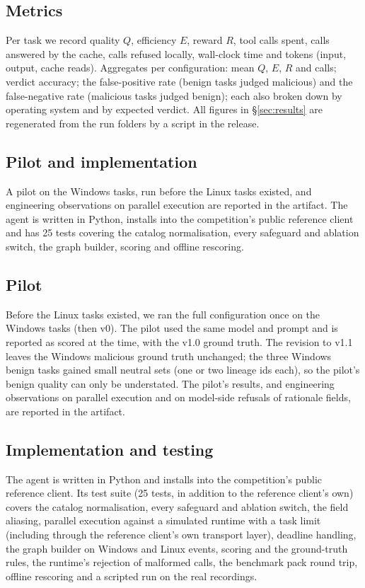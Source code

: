 \subsection{Metrics}
Per task we record quality $Q$, efficiency $E$, reward $R$, tool calls spent, calls answered by the cache,
calls refused locally, wall-clock time and tokens (input, output, cache reads). Aggregates per configuration:
mean $Q$, $E$, $R$ and calls; verdict accuracy; the false-positive rate (benign tasks judged malicious) and the
false-negative rate (malicious tasks judged benign); each also broken down by operating system and by expected
verdict. All figures in \S\ref{sec:results} are regenerated from the run folders by a script in the release.

\ifconf
\subsection{Pilot and implementation}
A pilot on the \ResPilotTasks{} Windows tasks, run before the Linux tasks existed, and engineering observations
on parallel execution are reported in the artifact. The agent is
written in Python, installs into the competition's public reference client and has 25 tests covering the
catalog normalisation, every safeguard and ablation switch, the graph builder, scoring and offline rescoring.
\else
\subsection{Pilot}
Before the Linux tasks existed, we ran the full configuration once on the \ResPilotTasks{} Windows tasks (then
\bench v0). The pilot used the same model and prompt and is reported as scored at the time, with the v1.0
ground truth. The revision to v1.1 leaves the Windows malicious ground truth unchanged; the three Windows benign
tasks gained small neutral sets (one or two lineage ids each), so the pilot's benign quality can only be
understated.\ifconf{} The pilot's results, and engineering observations on parallel execution and on
model-side refusals of rationale fields, are reported in the artifact.\fi

\subsection{Implementation and testing}
The agent is written in Python and installs into the competition's public reference client. Its test suite
(25 tests, in addition to the reference client's own) covers the catalog normalisation, every safeguard and
ablation switch, the field aliasing, parallel execution against a simulated runtime with a task limit
(including through the reference client's own transport layer), deadline handling, the graph builder on
Windows and Linux events, scoring and the ground-truth rules, the runtime's rejection of malformed calls, the
benchmark pack round trip, offline rescoring and a scripted run on the real recordings.
\fi
